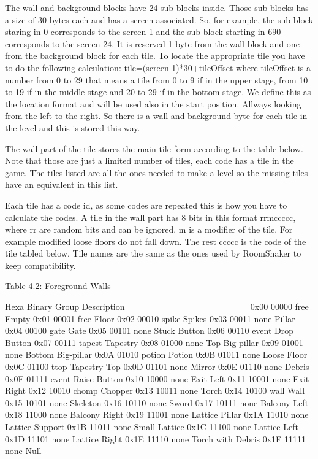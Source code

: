  The wall and background blocks have 24 sub-blocks inside. Those sub-blocks
 has a size of 30 bytes each and has a screen associated. So, for example,
 the sub-block staring in 0 corresponds to the screen 1 and the sub-block
 starting in 690 corresponds to the screen 24.
 It is reserved 1 byte from the wall block and one from the background
 block for each tile. To locate the appropriate tile you have to do the
 following calculation: tile=(screen-1)*30+tileOffset where tileOffset is a
 number
 from 0 to 29 that means a tile from 0 to 9 if in the upper stage, from
 10 to 19 if in the middle stage and 20 to 29 if in the bottom stage.
 We define this as the location format and will be used also in the start
 position.
 Allways looking from the left to the right.
 So there is a wall and background byte for each tile in the level and this
 is stored this way.

 The wall part of the tile stores the main tile form according to the table
 below. Note that those are just a limited number of tiles, each code has a
 tile in the game. The tiles listed are all the ones needed to make a level
 so the missing tiles have an equivalent in this list.

 Each tile has a code id, as some codes are repeated this is how you have
 to calculate the codes. A tile in the wall part has 8 bits in this format
 rrmccccc, where rr are random bits and can be ignored. m is a modifier of
 the tile. For example modified loose floors do not fall down. The rest
 ccccc is the code of the tile tabled below. Tile names are the same as the
 ones used by RoomShaker to keep compatibility.

                   Table 4.2: Foreground Walls
                   ~~~~~~~~~~~~~~~~~~~~~~~~~~~

  Hexa Binary Group  Description
  ~~~~ ~~~~~~ ~~~~~  ~~~~~~~~~~~
  0x00 00000  free   Empty
  0x01 00001  free   Floor
  0x02 00010  spike  Spikes
  0x03 00011  none   Pillar
  0x04 00100  gate   Gate
  0x05 00101  none   Stuck Button
  0x06 00110  event  Drop Button
  0x07 00111  tapest Tapestry
  0x08 01000  none   Top Big-pillar
  0x09 01001  none   Bottom Big-pillar
  0x0A 01010  potion Potion
  0x0B 01011  none   Loose Floor
  0x0C 01100  ttop   Tapestry Top
  0x0D 01101  none   Mirror
  0x0E 01110  none   Debris
  0x0F 01111  event  Raise Button
  0x10 10000  none   Exit Left
  0x11 10001  none   Exit Right
  0x12 10010  chomp  Chopper
  0x13 10011  none   Torch
  0x14 10100  wall   Wall
  0x15 10101  none   Skeleton
  0x16 10110  none   Sword
  0x17 10111  none   Balcony Left
  0x18 11000  none   Balcony Right
  0x19 11001  none   Lattice Pillar
  0x1A 11010  none   Lattice Support
  0x1B 11011  none   Small Lattice
  0x1C 11100  none   Lattice Left
  0x1D 11101  none   Lattice Right
  0x1E 11110  none   Torch with Debris
  0x1F 11111  none   Null

